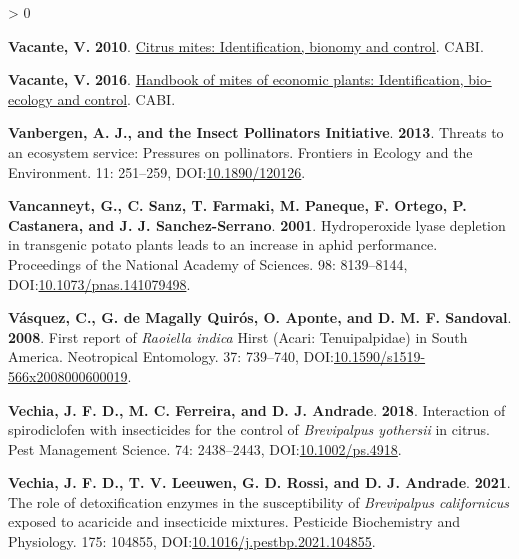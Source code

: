 \documentclass{ufdissertation}[overrideChapters] %
\newlength{\cslhangindent}
\newenvironment{CSLReferences}[2] %
 {%
  \setlength{\parindent}{0pt}
  \ifodd #1 \everypar{\setlength{\hangindent}{\cslhangindent}}\ignorespaces\fi
  \ifnum #2 > 0
  \setlength{\parskip}{#2\baselineskip}
  \fi
 }%
 {}
\begin{document}
{\begin{CSLReferences}{1}{1}
\leavevmode{}%
\textbf{Vacante, V.} \textbf{2010}. \href{https://www.ebook.de/de/product/8907013/vincenzo_vacante_citrus_mites_identification_bionomy_and_control.html}{Citrus mites: Identification, bionomy and control}. CABI.

\leavevmode{}%
\textbf{Vacante, V.} \textbf{2016}. \href{https://www.ebook.de/de/product/24216869/vincenzo_vacante_handbook_of_mites_of_economic_plants_identification_bio_ecology_and_control.html}{Handbook of mites of economic plants: Identification, bio-ecology and control}. CABI.

\leavevmode{}%
\textbf{Vanbergen, A. J., and the Insect Pollinators Initiative}. \textbf{2013}. Threats to an ecosystem service: Pressures on pollinators. Frontiers in Ecology and the Environment. 11: 251--259, DOI:\href{https://doi.org/10.1890/120126}{10.1890/120126}.

\leavevmode{}%
\textbf{Vancanneyt, G., C. Sanz, T. Farmaki, M. Paneque, F. Ortego, P. Castanera, and J. J. Sanchez-Serrano}. \textbf{2001}. Hydroperoxide lyase depletion in transgenic potato plants leads to an increase in aphid performance. Proceedings of the National Academy of Sciences. 98: 8139--8144, DOI:\href{https://doi.org/10.1073/pnas.141079498}{10.1073/pnas.141079498}.

\leavevmode{}%
\textbf{Vásquez, C., G. de Magally Quirós, O. Aponte, and D. M. F. Sandoval}. \textbf{2008}. First report of {\emph{Raoiella indica}} {Hirst} ({Acari}: {Tenuipalpidae}) in {South} {America}. Neotropical Entomology. 37: 739--740, DOI:\href{https://doi.org/10.1590/s1519-566x2008000600019}{10.1590/s1519-566x2008000600019}.

\leavevmode{}%
\textbf{Vechia, J. F. D., M. C. Ferreira, and D. J. Andrade}. \textbf{2018}. Interaction of spirodiclofen with insecticides for the control of {\emph{Brevipalpus yothersii}} in citrus. Pest Management Science. 74: 2438--2443, DOI:\href{https://doi.org/10.1002/ps.4918}{10.1002/ps.4918}.

\leavevmode{}%
\textbf{Vechia, J. F. D., T. V. Leeuwen, G. D. Rossi, and D. J. Andrade}. \textbf{2021}. The role of detoxification enzymes in the susceptibility of {\emph{Brevipalpus californicus}} exposed to acaricide and insecticide mixtures. Pesticide Biochemistry and Physiology. 175: 104855, DOI:\href{https://doi.org/10.1016/j.pestbp.2021.104855}{10.1016/j.pestbp.2021.104855}.


\end{CSLReferences}}
\end{document}
